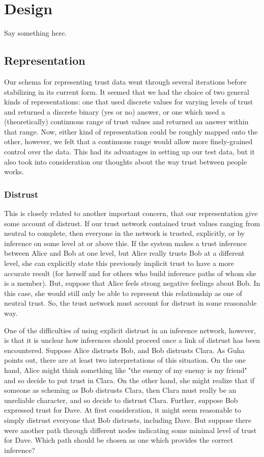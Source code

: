 \documentclass{acm_proc_article-sp}
\begin{document}
\section{Design}
Say something here.

\subsection{Representation}
Our schema for representing trust data went through several iterations before stabilizing in its current form.  It seemed that we had the choice of two general kinds of representations:  one that used discrete values for varying levels of trust and returned a discrete binary (yes or no) answer, or one which used a (theoretically) continuous range of trust values and returned an answer within that range.  Now, either kind of representation could be roughly mapped onto the other, however, we felt that a continuous range would allow more finely-grained control over the data.  This had its advantages in setting up our test data, but it also took into consideration our thoughts about the way trust between people works.  
\subsubsection{Distrust}
This is closely related to another important concern, that our representation give some account of distrust.  If our trust network contained trust values ranging from neutral to complete, then everyone in the network is trusted, explicitly, or by inference on some level at or above this.  If the system makes a trust inference between Alice and Bob at one level, but Alice really trusts Bob at a different level, she can explicitly state this previously implicit trust to have a more accurate result (for herself and for others who build inference paths of whom she is a member).  But, suppose that Alice feels strong negative feelings about Bob.  In this case, she would still only be able to represent this relationship as one of neutral trust.  So, the trust network must account for distrust in some reasonable way.

One of the difficulties of using explicit distrust in an inference network, however, is that it is unclear how inferences should proceed once a link of distrust has been encountered.  Suppose Alice distrusts Bob, and Bob distrusts Clara.  As Guha points out\cite{guha04propagation}, there are at least two interpretations of this situation.  On the one hand, Alice might think something like "the enemy of my enemy is my friend" and so decide to put trust in Clara.  On the other hand, she might realize that if someone as scheming as Bob distrusts Clara, then Clara must really be an unreliable character, and so decide to distrust Clara.  Further, suppose Bob expressed trust for Dave.  At first consideration, it might seem reasonable to simply distrust everyone that Bob distrusts, including Dave.  But suppose there were another path through different nodes indicating some minimal level of trust for Dave.  Which path should be chosen as one which provides the correct inference?
\end{document}
